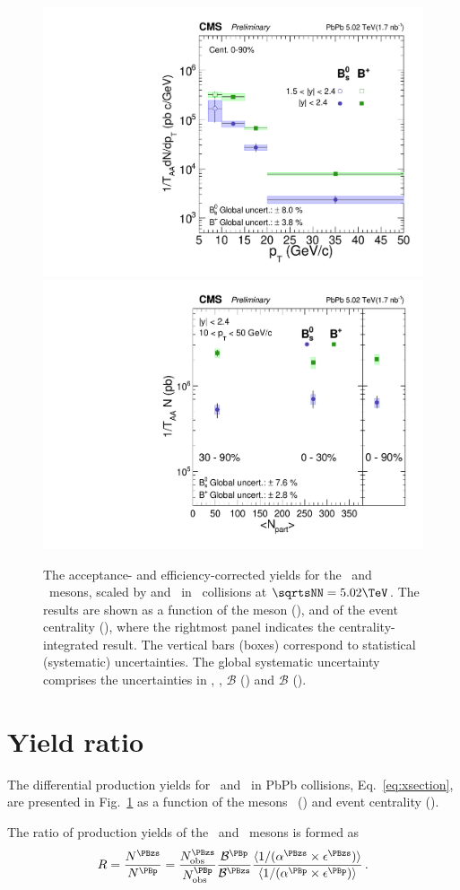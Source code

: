 \documentclass[11pt,twoside,a4paper,cmspaper]{cms-tdr}
\begin{document}
\begin{figure}[t]
\centering
\includegraphics[width=.48\textwidth]{xsect_vsPt.pdf}
\includegraphics[width=.48\textwidth]{xsect_vsCent.pdf}
\caption{The acceptance- and efficiency-corrected yields for the \PBp\  and \PBzs\ mesons, scaled by \TAA and \NMB\ in \PbPb\ collisions at $\sqrtsNN=5.02\TeV$. The results are shown as a function of the meson \pt (\cmsLeft), and of the event centrality (\cmsRight), where the rightmost panel indicates the centrality-integrated result.  The vertical bars (boxes) correspond to statistical (systematic) uncertainties. The global systematic uncertainty comprises the uncertainties in \TAA, \NMB, $\mathcal{B}$ (\cmsLeft) and $\mathcal{B}$ (\cmsRight).
}
\label{fig:xsections}
\end{figure}



\section{Yield ratio}

The differential production yields for \PBzs\ and \PBp\ in PbPb collisions, Eq.~\ref{eq:xsection}, 
are presented in Fig.~\ref{fig:xsections} as a function of the mesons \pt\ (\cmsLeft) and event centrality (\cmsRight).

The ratio of production yields of the \PBzs\ and \PBp\ mesons
is formed as
%
\begin{equation}
R = \frac{N^{\PBzs}}{N^{\PBp}} = 
\frac{N_{\rm{obs}}^{\PBzs}}{N_{\rm{obs}}^{\PBp}}
\frac{ \mathcal{B}^{\PBp}}{ \mathcal{B}^{\PBzs}} 
\frac{\langle 1/(\alpha^{\PBzs} \times \epsilon^{\PBzs})\rangle}
     {\langle 1/(\alpha^{\PBp}  \times \epsilon^{\PBp} )\rangle}
\, .
\label{eq:ratio}
\end{equation}
%
\end{document}
